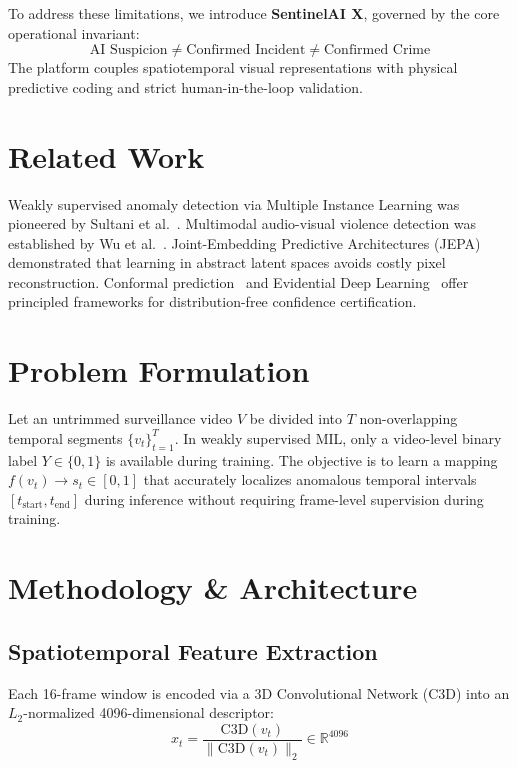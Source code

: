 \documentclass[10pt,journal,compsoc]{IEEEtran}
\begin{document}
To address these limitations, we introduce \textbf{SentinelAI X}, governed by the core operational invariant:
\begin{equation}
\text{AI Suspicion} \neq \text{Confirmed Incident} \neq \text{Confirmed Crime}
\end{equation}
The platform couples spatiotemporal visual representations with physical predictive coding and strict human-in-the-loop validation.

\section{Related Work}
Weakly supervised anomaly detection via Multiple Instance Learning was pioneered by Sultani et al.~\cite{sultani2018real}. Multimodal audio-visual violence detection was established by Wu et al.~\cite{wu2020not}. Joint-Embedding Predictive Architectures (JEPA)~\cite{assran2023self} demonstrated that learning in abstract latent spaces avoids costly pixel reconstruction. Conformal prediction~\cite{angelopoulos2021gentle} and Evidential Deep Learning~\cite{sensoy2018evidential} offer principled frameworks for distribution-free confidence certification.

\section{Problem Formulation}
Let an untrimmed surveillance video $V$ be divided into $T$ non-overlapping temporal segments $\{v_t\}_{t=1}^T$. In weakly supervised MIL, only a video-level binary label $Y \in \{0, 1\}$ is available during training. The objective is to learn a mapping $f(v_t) \to s_t \in [0, 1]$ that accurately localizes anomalous temporal intervals $[t_{\text{start}}, t_{\text{end}}]$ during inference without requiring frame-level supervision during training.

\section{Methodology \& Architecture}

\subsection{Spatiotemporal Feature Extraction}
Each 16-frame window is encoded via a 3D Convolutional Network (C3D) into an $L_2$-normalized 4096-dimensional descriptor:
\begin{equation}
x_t = \frac{\text{C3D}(v_t)}{\|\text{C3D}(v_t)\|_2} \in \mathbb{R}^{4096}
\end{equation}
\end{document}

